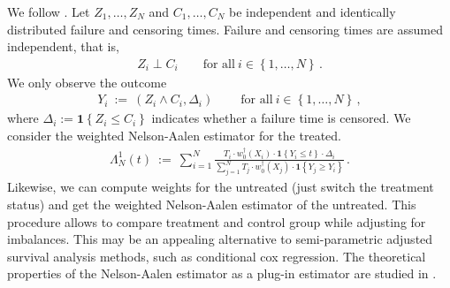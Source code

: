 We follow \cite[Example~3.9.19]{vaart2013}.
Let 
$Z_1,\ldots,Z_N$
and
$C_1,\ldots,C_N$ 
be independent and identically distributed failure and censoring  times.
Failure and censoring times are assumed independent, that is, 
\begin{align*}
  Z_i \perp C_i
  \qquad
  \text{for all}\ 
  i\in \left\{ 1,\ldots,N \right\}
  \,.
\end{align*}
We only observe the outcome
\begin{align*}
  Y_i
  \ 
  :=
  \ 
  \left( 
  Z_i
  \land
  C_i
  ,
  \Delta_i
  \right)
  \ 
  \qquad
  \text{for all}\ 
  i\in \left\{ 1,\ldots,N \right\}
  \,,
\end{align*}
where 
$
\Delta_i:=
\mathbf{1}
\left\{ 
  Z_i\le C_i
\right\}
$
indicates whether a failure time is censored. 
We consider the weighted Nelson-Aalen estimator for the treated.
\begin{align*}
  \Lambda^1_N(t)
  \ 
  :=
  \ 
  \sum_{i=1}^{N} \frac{
    T_i\cdot w^\dagger_0(X_i)\cdot\mathbf{1}\left\{ Y_i\le t \right\}
    \cdot \Delta_i
  }{
    \sum_{j=1}^{N} 
    T_j\cdot w^\dagger_0(X_j)\cdot\mathbf{1}\left\{ Y_j\ge Y_i \right\}
  } 
  \,.
\end{align*}
Likewise, we can compute weights for the untreated (just switch the treatment status) and get the weighted Nelson-Aalen estimator of the untreated.
This procedure allows to compare treatment and control group while adjusting for imbalances.
This may be an appealing alternative to semi-parametric adjusted survival analysis methods, such as conditional cox regression.
The theoretical properties of the Nelson-Aalen estimator as a plug-in estimator are studied in \cite[Example~3.9.19]{vaart2013}.
